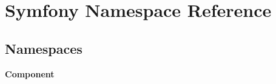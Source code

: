 \section{Symfony Namespace Reference}
\label{namespace_symfony}
\subsection*{Namespaces}
\begin{DoxyCompactItemize}
\item 
 {\bf Component}
\end{DoxyCompactItemize}
